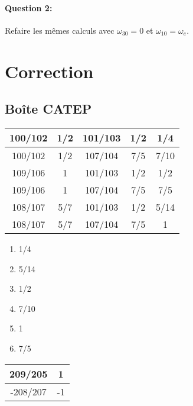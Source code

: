 \paragraph{Question 2:} Refaire les mêmes calculs avec $\omega_{30}=0$ et $\omega_{10}=\omega_e$.



\clearpage

\ifdef{\public}{}{}

\newpage

\pagestyle{correction}

\section{Correction}

\subsection{Boîte CATEP}


\begin{center}
\begin{tabular}{|c|c|c|c||c|}
\hline
100/102 & 1/2 & 101/103 & 1/2 & 1/4\\
\hline
100/102 & 1/2 & 107/104 & 7/5 & 7/10\\
\hline
109/106 & 1 & 101/103 & 1/2 & 1/2\\
\hline
109/106 & 1 & 107/104 & 7/5 & 7/5\\
\hline
108/107 & 5/7 & 101/103 & 1/2 & 5/14\\
\hline
108/107 & 5/7 & 107/104 & 7/5 & 1\\
\hline
\end{tabular}
\end{center}

\begin{enumerate}
 \item 1/4
 \item 5/14
 \item 1/2
 \item 7/10
 \item 1
 \item 7/5
\end{enumerate}


\begin{center}
\begin{tabular}{|c|c|}
\hline
209/205 & 1 \\
\hline
-208/207 & -1 \\
\hline
\end{tabular}
\end{center}

